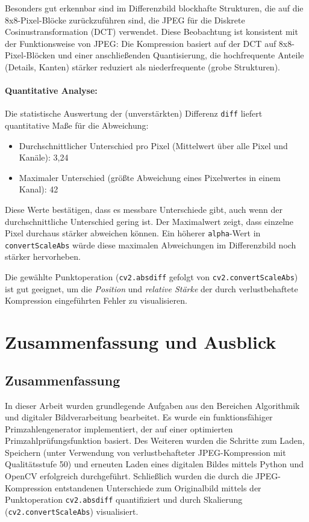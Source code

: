 \documentclass[11pt, a4paper]{article}
\begin{document}
Besonders gut erkennbar sind im Differenzbild blockhafte Strukturen, die auf die 8x8-Pixel-Blöcke zurückzuführen sind, die JPEG für die Diskrete Cosinustransformation (DCT) verwendet. Diese Beobachtung ist konsistent mit der Funktionsweise von JPEG: Die Kompression basiert auf der DCT auf 8x8-Pixel-Blöcken und einer anschließenden Quantisierung, die hochfrequente Anteile (Details, Kanten) stärker reduziert als niederfrequente (grobe Strukturen).

\paragraph{Quantitative Analyse:}
Die statistische Auswertung der (unverstärkten) Differenz \texttt{diff} liefert quantitative Maße für die Abweichung:
\begin{itemize}
    \item Durchschnittlicher Unterschied pro Pixel (Mittelwert über alle Pixel und Kanäle): 3,24
    \item Maximaler Unterschied (größte Abweichung eines Pixelwertes in einem Kanal): 42
\end{itemize}
Diese Werte bestätigen, dass es messbare Unterschiede gibt, auch wenn der durchschnittliche Unterschied gering ist. Der Maximalwert zeigt, dass einzelne Pixel durchaus stärker abweichen können. Ein höherer \texttt{alpha}-Wert in \texttt{convertScaleAbs} würde diese maximalen Abweichungen im Differenzbild noch stärker hervorheben.

Die gewählte Punktoperation (\texttt{cv2.absdiff} gefolgt von \texttt{cv2.convertScaleAbs}) ist gut geeignet, um die \textit{Position} und \textit{relative Stärke} der durch verlustbehaftete Kompression eingeführten Fehler zu visualisieren.


\section{Zusammenfassung und Ausblick}

\subsection{Zusammenfassung}
In dieser Arbeit wurden grundlegende Aufgaben aus den Bereichen Algorithmik und digitaler Bildverarbeitung bearbeitet. Es wurde ein funktionsfähiger Primzahlengenerator implementiert, der auf einer optimierten Primzahlprüfungsfunktion basiert. Des Weiteren wurden die Schritte zum Laden, Speichern (unter Verwendung von verlustbehafteter JPEG-Kompression mit Qualitätsstufe 50) und erneuten Laden eines digitalen Bildes mittels Python und OpenCV erfolgreich durchgeführt. Schließlich wurden die durch die JPEG-Kompression entstandenen Unterschiede zum Originalbild mittels der Punktoperation \texttt{cv2.absdiff} quantifiziert und durch Skalierung (\texttt{cv2.convertScaleAbs}) visualisiert.
\end{document}
